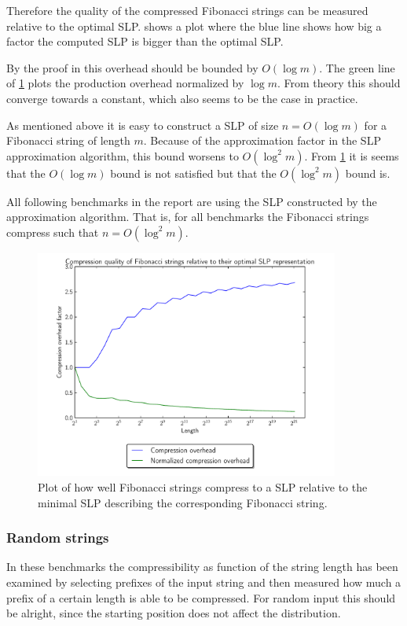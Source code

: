 \documentclass[twoside,11pt,openright]{report}
\begin{document}
Therefore the quality of the compressed Fibonacci strings can be measured relative to the optimal SLP.  shows a plot where the blue line shows how big a factor the computed SLP is bigger than the optimal SLP.

By the proof in \cite{Rytter2003211} this overhead should be bounded by $O(\log{m})$. The green line of \cref{fig:compression:quality:fibonacci} plots the production overhead normalized by $\log{m}$. From theory this should converge towards a constant, which also seems to be the case in practice.

As mentioned above it is easy to construct a SLP of size $n = O(\log{m})$ for a Fibonacci string of length $m$. Because of the approximation factor in the SLP approximation algorithm, this bound worsens to $O(\log^2{m})$. From \cref{fig:compression:quality:fibonacci} it is seems that the $O(\log{m})$ bound is not satisfied but that the $O(\log^2{m})$ bound is.

All following benchmarks in the report are using the SLP constructed by the approximation algorithm. That is, for all benchmarks the Fibonacci strings compress such that $n = O(\log^2{m})$.
%
\begin{figure}[h!]
  \centering
  \includegraphics[width=10cm]{compression/fib}
  \caption{Plot of how well Fibonacci strings compress to a SLP relative to the minimal SLP describing the corresponding Fibonacci string.}
  \label{fig:compression:quality:fibonacci}
\end{figure}

\subsubsection{Random strings}
In these benchmarks the compressibility as function of the string length has been examined by selecting prefixes of the input string and then measured how much a prefix of a certain length is able to be compressed. For random input this should be alright, since the starting position does not affect the distribution.
\end{document}
